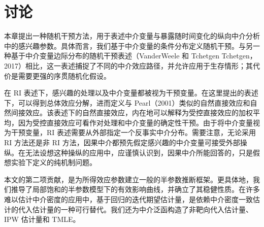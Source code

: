 \section{讨论}

本章提出一种随机干预方法，用于表述中介变量与暴露随时间变化的纵向中介分析中的感兴趣参数。具体而言，我们基于中介变量的条件分布定义随机干预。与另一种基于中介变量边际分布的随机干预表述（VanderWeele 和 Tchetgen Tchetgen，2017）相比，这一表述捕捉了不同的中介效应路径，并允许应用于生存情形；其代价是需要更强的序贯随机化假设。

在 RI 表述下，感兴趣的处理以及中介变量都被视为干预变量。在这里提出的表述下，可以得到总体效应分解，进而定义与 Pearl（2001）类似的自然直接效应和自然间接效应。该表述下的自然直接效应，内在地可以解释为受控直接效应的加权平均，因为受控直接效应可看作对处理和中介变量的确定性干预。由于将中介变量视为干预变量，RI 表述需要从外部指定一个反事实中介分布。需要注意，无论采用 RI 方法还是非 RI 方法，因果中介都预先假定感兴趣的中介变量可接受外部操纵。在无法设想这种操纵的应用中，应谨慎认识到，因果中介所能回答的，只是假想实验下定义的纯机制问题。

本文的第二项贡献，是为所得效应参数建立一般的半参数推断框架。更具体地，我们推导了局部饱和的半参数模型下的有效影响曲线，并确立了其稳健性质。在许多难以估计中介密度的应用中，基于回归的迭代期望估计量，是依赖中介密度一致估计的代入估计量的一种可行替代。我们还为中介泛函构造了非靶向代入估计量、IPW 估计量和 TMLE。

